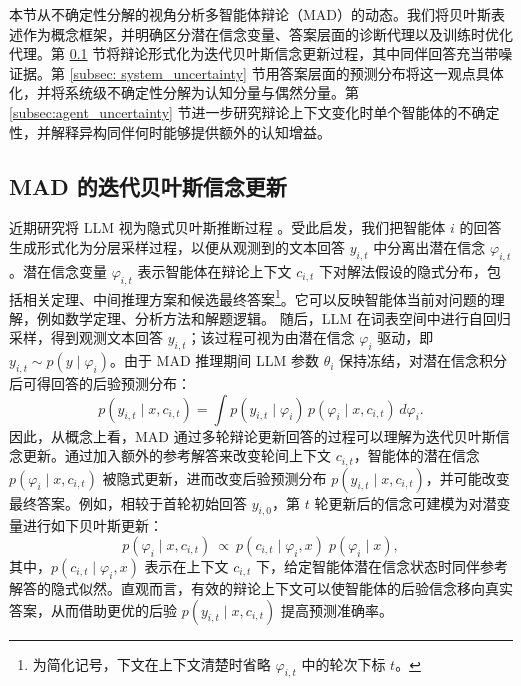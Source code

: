 \documentclass{article}
\theoremstyle{plain}
\theoremstyle{definition}
\theoremstyle{remark}
\begin{document}
本节从不确定性分解的视角分析多智能体辩论（MAD）的动态。我们将贝叶斯表述作为概念框架，并明确区分潜在信念变量、答案层面的诊断代理以及训练时优化代理。第 \ref{subsec: iterative_bayes} 节将辩论形式化为迭代贝叶斯信念更新过程，其中同伴回答充当带噪证据。第 \ref{subsec: system_uncertainty} 节用答案层面的预测分布将这一观点具体化，并将系统级不确定性分解为认知分量与偶然分量。第 \ref{subsec:agent_uncertainty} 节进一步研究辩论上下文变化时单个智能体的不确定性，并解释异构同伴何时能够提供额外的认知增益。


\subsection{MAD 的迭代贝叶斯信念更新}\label{subsec: iterative_bayes} 
近期研究将 LLM 视为隐式贝叶斯推断过程 \cite{jayasekera2025variational, xie2021explanation, choi2025debate}。受此启发，我们把智能体 $i$ 的回答生成形式化为分层采样过程，以便从观测到的文本回答 $y_{i,t}$ 中分离出潜在信念 $\varphi_{i,t}$。潜在信念变量 $\varphi_{i,t}$ 表示智能体在辩论上下文 $c_{i,t}$ 下对解法假设的隐式分布，包括相关定理、中间推理方案和候选最终答案\footnote{为简化记号，下文在上下文清楚时省略 $\varphi_{i,t}$ 中的轮次下标 $t$。}。它可以反映智能体当前对问题的理解，例如数学定理、分析方法和解题逻辑。
随后，LLM 在词表空间中进行自回归采样，得到观测文本回答 $y_{i,t}$；该过程可视为由潜在信念 $\varphi_i$ 驱动，即 $y_{i,t} \sim p(y \mid \varphi_{i})$。由于 MAD 推理期间 LLM 参数 $\theta_i$ 保持冻结，对潜在信念积分后可得回答的后验预测分布：
\begin{equation*}
 p(y_{i,t} \mid x,c_{i,t}) = \int p(y_{i,t} \mid \varphi_{i})\,p(\varphi_{i} \mid x,c_{i,t})\,d\varphi_{i}.
\end{equation*}
因此，从概念上看，MAD 通过多轮辩论更新回答的过程可以理解为迭代贝叶斯信念更新。通过加入额外的参考解答来改变轮间上下文 $c_{i,t}$，智能体的潜在信念 $p(\varphi_i\mid x,c_{i,t})$ 被隐式更新，进而改变后验预测分布 $p(y_{i,t}\mid x,c_{i,t})$，并可能改变最终答案。例如，相较于首轮初始回答 $y_{i,0}$，第 $t$ 轮更新后的信念可建模为对潜变量进行如下贝叶斯更新：
\begin{equation}\label{eq:bayes_belief}
 p(\varphi_{i} \mid x,c_{i,t})
\ \propto\
p(c_{i,t}\mid \varphi_{i},x)\;p(\varphi_{i} \mid x),
\end{equation}
其中，$p(c_{i,t}\mid \varphi_i,x)$ 表示在上下文 $c_{i,t}$ 下，给定智能体潜在信念状态时同伴参考解答的隐式似然。直观而言，有效的辩论上下文可以使智能体的后验信念移向真实答案，从而借助更优的后验 $p(y_{i,t}\mid x,c_{i,t})$ 提高预测准确率。
\end{document}
